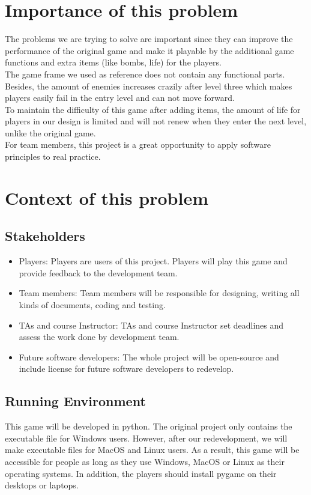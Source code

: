 \documentclass[12pt]{article}
\begin{document}
\section{Importance of this problem}
The problems we are trying to solve are important since they can improve the performance of the original game and make it playable by the additional game functions and extra items (like bombs, life) for the players.\\ 
The game frame we used as reference does not contain any functional parts. Besides, the amount of enemies increases crazily after level three which makes players easily fail in the entry level and can not move forward.\\
To maintain the difficulty of this game after adding items, the amount of life for players in our design is limited and will not renew when they enter the next level, unlike the original game.\\
For team members, this project is a great opportunity to apply 
software principles to real practice. 

\section{Context of this problem}
\subsection{Stakeholders}
\begin{itemize}
\item Players: Players are users of this project. Players will play this game and provide feedback to the development team.
\item Team members: Team members will be responsible for designing,
writing all kinds of documents, coding and testing.
\item TAs and course Instructor: TAs and course Instructor set deadlines and assess the work done by development team.
\item Future software developers: The whole project will be open-source and include license for future software developers to
redevelop.
\end{itemize}
\subsection{Running Environment}
This game will be developed in python. The original project only contains the executable file for Windows users. However, after our redevelopment, we will make executable files for MacOS and Linux users. As a result, this game will be accessible for people as long as they use Windows, MacOS or Linux as their operating systems. In addition, the players should install pygame on their desktops or laptops.
\end{document}
